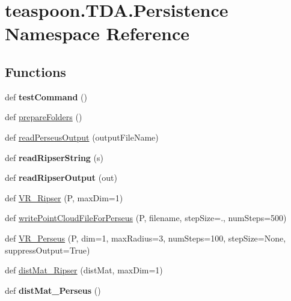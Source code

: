 \hypertarget{namespaceteaspoon_1_1_t_d_a_1_1_persistence}{}\section{teaspoon.\+T\+D\+A.\+Persistence Namespace Reference}
\label{namespaceteaspoon_1_1_t_d_a_1_1_persistence}
\subsection*{Functions}
\begin{DoxyCompactItemize}
\item 
def {\bfseries test\+Command} ()\hypertarget{namespaceteaspoon_1_1_t_d_a_1_1_persistence_acc283535d8596af92ab1e7e9455d09b2}{}\label{namespaceteaspoon_1_1_t_d_a_1_1_persistence_acc283535d8596af92ab1e7e9455d09b2}

\item 
def \hyperlink{namespaceteaspoon_1_1_t_d_a_1_1_persistence_aa767596a9f61323ef4e489e42890cd45}{prepare\+Folders} ()
\item 
def \hyperlink{namespaceteaspoon_1_1_t_d_a_1_1_persistence_a3d273210437e69be2df595ed1751c661}{read\+Perseus\+Output} (output\+File\+Name)
\item 
def {\bfseries read\+Ripser\+String} (s)\hypertarget{namespaceteaspoon_1_1_t_d_a_1_1_persistence_a862eea03c953145bb9290c1681f1f850}{}\label{namespaceteaspoon_1_1_t_d_a_1_1_persistence_a862eea03c953145bb9290c1681f1f850}

\item 
def {\bfseries read\+Ripser\+Output} (out)\hypertarget{namespaceteaspoon_1_1_t_d_a_1_1_persistence_a4ea0e5c0180eff1391c4ac0cf126694c}{}\label{namespaceteaspoon_1_1_t_d_a_1_1_persistence_a4ea0e5c0180eff1391c4ac0cf126694c}

\item 
def \hyperlink{namespaceteaspoon_1_1_t_d_a_1_1_persistence_ae38f90d312da5c7fb8587a2f44e67b8a}{V\+R\+\_\+\+Ripser} (P, max\+Dim=1)
\item 
def \hyperlink{namespaceteaspoon_1_1_t_d_a_1_1_persistence_a074e092c57bca5b1652c7b2a2c41f603}{write\+Point\+Cloud\+File\+For\+Perseus} (P, filename, step\+Size=., num\+Steps=500)
\item 
def \hyperlink{namespaceteaspoon_1_1_t_d_a_1_1_persistence_ae3954f45636c5f88b8e7cb7b422eea3d}{V\+R\+\_\+\+Perseus} (P, dim=1, max\+Radius=3, num\+Steps=100, step\+Size=None, suppress\+Output=True)
\item 
def \hyperlink{namespaceteaspoon_1_1_t_d_a_1_1_persistence_a5d253547a9b956b8d5169808f31b42d2}{dist\+Mat\+\_\+\+Ripser} (dist\+Mat, max\+Dim=1)
\item 
def {\bfseries dist\+Mat\+\_\+\+Perseus} ()\hypertarget{namespaceteaspoon_1_1_t_d_a_1_1_persistence_a0660fcd00ca57001f21bfaaefb1da9c3}{}\label{namespaceteaspoon_1_1_t_d_a_1_1_persistence_a0660fcd00ca57001f21bfaaefb1da9c3}


\end{DoxyCompactItemize}
